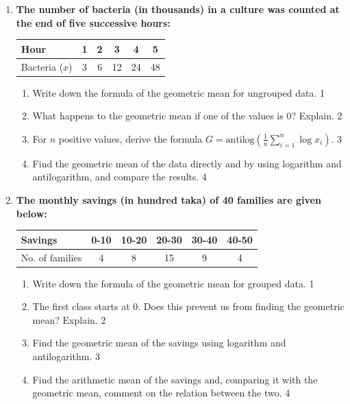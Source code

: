 \documentclass[a4paper,oneside]{book}
\begin{document}
\begin{enumerate}
\item
\textbf{The number of bacteria (in thousands) in a culture was counted at the end of five successive hours:}
\begin{center}
\begin{tabular}{l|c|c|c|c|c}
Hour & 1 & 2 & 3 & 4 & 5 \\ \hline
Bacteria ($x$) & 3 & 6 & 12 & 24 & 48
\end{tabular}
\end{center}
\begin{enumerate}
  \item Write down the formula of the geometric mean for ungrouped data. \hfill 1
  \item What happens to the geometric mean if one of the values is 0? Explain. \hfill 2
  \item For $n$ positive values, derive the formula $\displaystyle G = \mbox{antilog}\left(\frac{1}{n}\sum_{i=1}^{n} \log x_i\right)$. \hfill 3
  \item Find the geometric mean of the data directly and by using logarithm and antilogarithm, and compare the results. \hfill 4
\end{enumerate}

\item
\textbf{The monthly savings (in hundred taka) of 40 families are given below:}
\begin{center}
\begin{tabular}{l|c|c|c|c|c}
Savings & 0-10 & 10-20 & 20-30 & 30-40 & 40-50 \\ \hline
No. of families & 4 & 8 & 15 & 9 & 4
\end{tabular}
\end{center}
\begin{enumerate}
  \item Write down the formula of the geometric mean for grouped data. \hfill 1
  \item The first class starts at 0. Does this prevent us from finding the geometric mean? Explain. \hfill 2
  \item Find the geometric mean of the savings using logarithm and antilogarithm. \hfill 3
  \item Find the arithmetic mean of the savings and, comparing it with the geometric mean, comment on the relation between the two. \hfill 4
\end{enumerate}


\end{enumerate}
\end{document}
